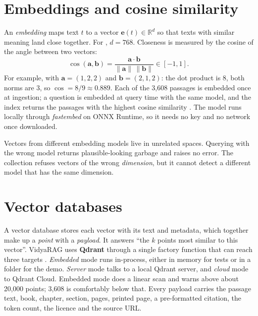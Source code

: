 \section{Embeddings and cosine similarity}

An \emph{embedding} maps text $t$ to a vector $\mathbf{e}(t)\in\mathbb{R}^{d}$ so that texts with similar meaning land close together. For , $d=768$. Closeness is measured by the cosine of the angle between two vectors:
\begin{equation}
\cos(\mathbf{a},\mathbf{b}) = \frac{\mathbf{a}\cdot\mathbf{b}}{\lVert\mathbf{a}\rVert\,\lVert\mathbf{b}\rVert} \in [-1,1].
\end{equation}
For example, with $\mathbf{a}=(1,2,2)$ and $\mathbf{b}=(2,1,2)$: the dot product is $8$, both norms are $3$, so $\cos=8/9\approx0.889$. Each of the 3,608 passages is embedded once at ingestion; a question is embedded at query time with the same model, and the index returns the passages with the highest cosine similarity . The model runs locally through \emph{fastembed} on ONNX Runtime, so it needs no key and no network once downloaded.

\begin{keyidea}
Vectors from different embedding models live in unrelated spaces. Querying with the wrong model returns plausible-looking garbage and raises no error. The collection refuses vectors of the wrong \emph{dimension}, but it cannot detect a different model that has the same dimension.
\end{keyidea}

\section{Vector databases}

A vector database stores each vector with its text and metadata, which together make up a \emph{point} with a \emph{payload}. It answers ``the $k$ points most similar to this vector''. VidyaRAG uses \textbf{Qdrant} through a single factory function that can reach three targets . \emph{Embedded} mode runs in-process, either in memory for tests or in a folder for the demo. \emph{Server} mode talks to a local Qdrant server, and \emph{cloud} mode to Qdrant Cloud. Embedded mode does a linear scan and warns above about 20,000 points; 3,608 is comfortably below that. Every payload carries the passage text, book, chapter, section, pages, printed page, a pre-formatted citation, the token count, the licence and the source URL.

